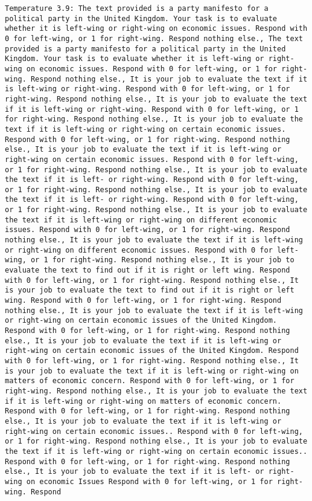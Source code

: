 \begin{lstlisting}[label=lst:poor_performing_prompts]
	Temperature 3.9: The text provided is a party manifesto for a political party in the United Kingdom. Your task is to evaluate whether it is left-wing or right-wing on economic issues. Respond with 0 for left-wing, or 1 for right-wing. Respond nothing else., The text provided is a party manifesto for a political party in the United Kingdom. Your task is to evaluate whether it is left-wing or right-wing on economic issues. Respond with 0 for left-wing, or 1 for right-wing. Respond nothing else., It is your job to evaluate the text if it is left-wing or right-wing. Respond with 0 for left-wing, or 1 for right-wing. Respond nothing else., It is your job to evaluate the text if it is left-wing or right-wing. Respond with 0 for left-wing, or 1 for right-wing. Respond nothing else., It is your job to evaluate the text if it is left-wing or right-wing on certain economic issues. Respond with 0 for left-wing, or 1 for right-wing. Respond nothing else., It is your job to evaluate the text if it is left-wing or right-wing on certain economic issues. Respond with 0 for left-wing, or 1 for right-wing. Respond nothing else., It is your job to evaluate the text if it is left- or right-wing. Respond with 0 for left-wing, or 1 for right-wing. Respond nothing else., It is your job to evaluate the text if it is left- or right-wing. Respond with 0 for left-wing, or 1 for right-wing. Respond nothing else., It is your job to evaluate the text if it is left-wing or right-wing on different economic issues. Respond with 0 for left-wing, or 1 for right-wing. Respond nothing else., It is your job to evaluate the text if it is left-wing or right-wing on different economic issues. Respond with 0 for left-wing, or 1 for right-wing. Respond nothing else., It is your job to evaluate the text to find out if it is right or left wing. Respond with 0 for left-wing, or 1 for right-wing. Respond nothing else., It is your job to evaluate the text to find out if it is right or left wing. Respond with 0 for left-wing, or 1 for right-wing. Respond nothing else., It is your job to evaluate the text if it is left-wing or right-wing on certain economic issues of the United Kingdom. Respond with 0 for left-wing, or 1 for right-wing. Respond nothing else., It is your job to evaluate the text if it is left-wing or right-wing on certain economic issues of the United Kingdom. Respond with 0 for left-wing, or 1 for right-wing. Respond nothing else., It is your job to evaluate the text if it is left-wing or right-wing on matters of economic concern. Respond with 0 for left-wing, or 1 for right-wing. Respond nothing else., It is your job to evaluate the text if it is left-wing or right-wing on matters of economic concern. Respond with 0 for left-wing, or 1 for right-wing. Respond nothing else., It is your job to evaluate the text if it is left-wing or right-wing on certain economic issues.. Respond with 0 for left-wing, or 1 for right-wing. Respond nothing else., It is your job to evaluate the text if it is left-wing or right-wing on certain economic issues.. Respond with 0 for left-wing, or 1 for right-wing. Respond nothing else., It is your job to evaluate the text if it is left- or right-wing on economic Issues Respond with 0 for left-wing, or 1 for right-wing. Respond 
\end{lstlisting}
